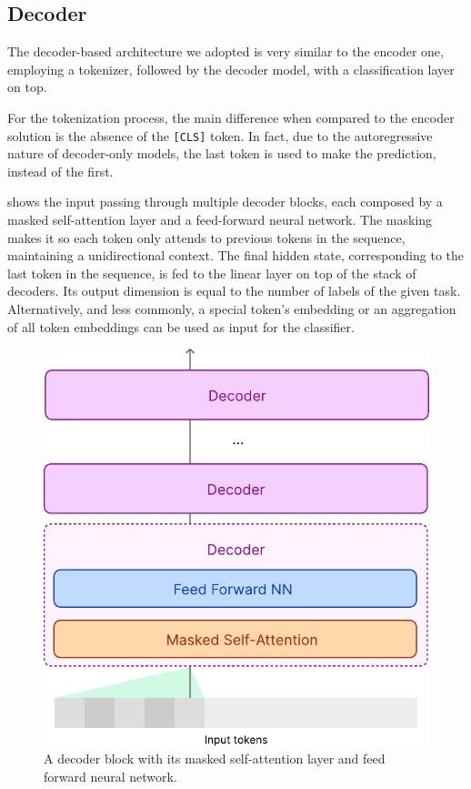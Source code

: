 \documentclass[11pt]{article}
\begin{document}
\subsection{Decoder}
The decoder-based architecture we adopted is very similar to the encoder one, employing a tokenizer, followed
by the decoder model, with a classification layer on top.

For the tokenization process, the main difference when compared to the encoder solution is the absence of the \texttt{[CLS]} token. 
In fact, due to the autoregressive nature
of decoder-only models, the last token is used to make the prediction, instead of the first.

 shows the input passing through multiple decoder blocks, each composed by a masked 
self-attention layer and a feed-forward neural network. The masking makes it so each token only attends to previous tokens in the sequence, maintaining a unidirectional context. The final hidden state, corresponding to the last
token in the sequence, is fed to the linear layer on top of the stack of decoders. Its output dimension is equal to 
the number of labels of the given task.
%
Alternatively, and less commonly, a special token's embedding or an aggregation of all token embeddings can be
used as input for the classifier.

\begin{figure}
  \centering
  \includegraphics[width=0.8\linewidth]{figures/decoder-block.pdf}
  \caption{
    A decoder block with its masked self-attention layer and feed forward neural network.
  }
  \label{fig:decoder-block}
\end{figure}
\end{document}

